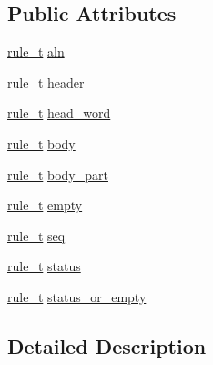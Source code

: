 \subsection*{Public Attributes}
\begin{DoxyCompactItemize}
\item 
\hyperlink{structaln__parser_1_1definition_a03794636bf4d0d047278756431378b21}{rule\+\_\+t} \hyperlink{structaln__parser_1_1definition_ab6919ea9346e2e607e34318f25211534}{aln}
\item 
\hyperlink{structaln__parser_1_1definition_a03794636bf4d0d047278756431378b21}{rule\+\_\+t} \hyperlink{structaln__parser_1_1definition_a7c56859f82c03b3f85d16095aea09f65}{header}
\item 
\hyperlink{structaln__parser_1_1definition_a03794636bf4d0d047278756431378b21}{rule\+\_\+t} \hyperlink{structaln__parser_1_1definition_a4ae49d8047c2156cbf75510ef5f3b434}{head\+\_\+word}
\item 
\hyperlink{structaln__parser_1_1definition_a03794636bf4d0d047278756431378b21}{rule\+\_\+t} \hyperlink{structaln__parser_1_1definition_ae6705116cb940909cda17ea3849c062f}{body}
\item 
\hyperlink{structaln__parser_1_1definition_a03794636bf4d0d047278756431378b21}{rule\+\_\+t} \hyperlink{structaln__parser_1_1definition_a64e55f65312e9ed84df5249ea54d45ea}{body\+\_\+part}
\item 
\hyperlink{structaln__parser_1_1definition_a03794636bf4d0d047278756431378b21}{rule\+\_\+t} \hyperlink{structaln__parser_1_1definition_afafdb23081539c09e9e4912b558d8332}{empty}
\item 
\hyperlink{structaln__parser_1_1definition_a03794636bf4d0d047278756431378b21}{rule\+\_\+t} \hyperlink{structaln__parser_1_1definition_a9f351b4a43adddc5d115367c48c9ec6c}{seq}
\item 
\hyperlink{structaln__parser_1_1definition_a03794636bf4d0d047278756431378b21}{rule\+\_\+t} \hyperlink{structaln__parser_1_1definition_a4209d9d63ba0c23bda9e14357d05c77a}{status}
\item 
\hyperlink{structaln__parser_1_1definition_a03794636bf4d0d047278756431378b21}{rule\+\_\+t} \hyperlink{structaln__parser_1_1definition_a9e5a7d05e2136f5f5870d98e5c732394}{status\+\_\+or\+\_\+empty}
\end{DoxyCompactItemize}


\subsection{Detailed Description}
